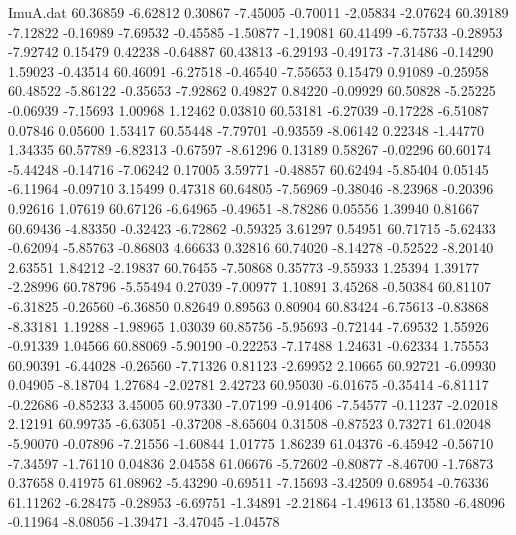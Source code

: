 \begin{filecontents}{ImuA.dat}
  60.36859   -6.62812    0.30867   -7.45005   -0.70011   -2.05834   -2.07624
  60.39189   -7.12822   -0.16989   -7.69532   -0.45585   -1.50877   -1.19081
  60.41499   -6.75733   -0.28953   -7.92742    0.15479    0.42238   -0.64887
  60.43813   -6.29193   -0.49173   -7.31486   -0.14290    1.59023   -0.43514
  60.46091   -6.27518   -0.46540   -7.55653    0.15479    0.91089   -0.25958
  60.48522   -5.86122   -0.35653   -7.92862    0.49827    0.84220   -0.09929
  60.50828   -5.25225   -0.06939   -7.15693    1.00968    1.12462    0.03810
  60.53181   -6.27039   -0.17228   -6.51087    0.07846    0.05600    1.53417
  60.55448   -7.79701   -0.93559   -8.06142    0.22348   -1.44770    1.34335
  60.57789   -6.82313   -0.67597   -8.61296    0.13189    0.58267   -0.02296
  60.60174   -5.44248   -0.14716   -7.06242    0.17005    3.59771   -0.48857
  60.62494   -5.85404    0.05145   -6.11964   -0.09710    3.15499    0.47318
  60.64805   -7.56969   -0.38046   -8.23968   -0.20396    0.92616    1.07619
  60.67126   -6.64965   -0.49651   -8.78286    0.05556    1.39940    0.81667
  60.69436   -4.83350   -0.32423   -6.72862   -0.59325    3.61297    0.54951
  60.71715   -5.62433   -0.62094   -5.85763   -0.86803    4.66633    0.32816
  60.74020   -8.14278   -0.52522   -8.20140    2.63551    1.84212   -2.19837
  60.76455   -7.50868    0.35773   -9.55933    1.25394    1.39177   -2.28996
  60.78796   -5.55494    0.27039   -7.00977    1.10891    3.45268   -0.50384
  60.81107   -6.31825   -0.26560   -6.36850    0.82649    0.89563    0.80904
  60.83424   -6.75613   -0.83868   -8.33181    1.19288   -1.98965    1.03039
  60.85756   -5.95693   -0.72144   -7.69532    1.55926   -0.91339    1.04566
  60.88069   -5.90190   -0.22253   -7.17488    1.24631   -0.62334    1.75553
  60.90391   -6.44028   -0.26560   -7.71326    0.81123   -2.69952    2.10665
  60.92721   -6.09930    0.04905   -8.18704    1.27684   -2.02781    2.42723
  60.95030   -6.01675   -0.35414   -6.81117   -0.22686   -0.85233    3.45005
  60.97330   -7.07199   -0.91406   -7.54577   -0.11237   -2.02018    2.12191
  60.99735   -6.63051   -0.37208   -8.65604    0.31508   -0.87523    0.73271
  61.02048   -5.90070   -0.07896   -7.21556   -1.60844    1.01775    1.86239
  61.04376   -6.45942   -0.56710   -7.34597   -1.76110    0.04836    2.04558
  61.06676   -5.72602   -0.80877   -8.46700   -1.76873    0.37658    0.41975
  61.08962   -5.43290   -0.69511   -7.15693   -3.42509    0.68954   -0.76336
  61.11262   -6.28475   -0.28953   -6.69751   -1.34891   -2.21864   -1.49613
  61.13580   -6.48096   -0.11964   -8.08056   -1.39471   -3.47045   -1.04578

\end{filecontents}
